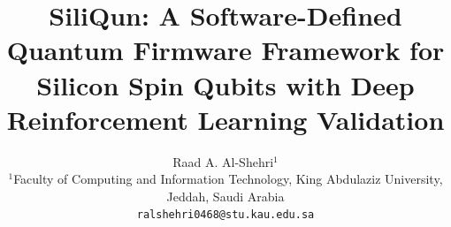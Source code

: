 \documentclass[twocolumn]{article}
\title{SiliQun: A Software-Defined Quantum Firmware Framework for Silicon
       Spin Qubits with Deep Reinforcement Learning Validation}
\author{Raad A. Al-Shehri$^{1}$ \\
        $^{1}$Faculty of Computing and Information Technology,
        King Abdulaziz University, Jeddah, Saudi Arabia \\
        \texttt{ralshehri0468@stu.kau.edu.sa}}
\date{}
\begin{document}
\maketitle

%
\begin{abstract}
\end{abstract}

%
\end{document}
